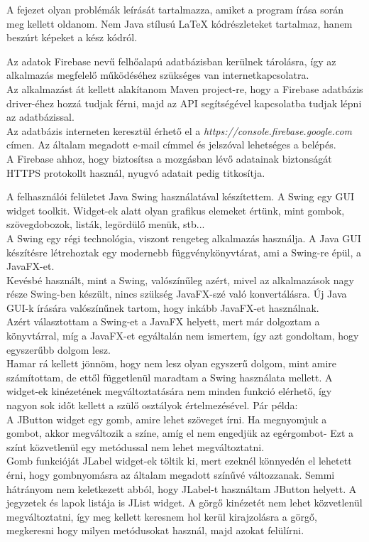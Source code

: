 A fejezet olyan problémák leírását tartalmazza, amiket a program írása során meg kellett oldanom. Nem Java stílusú LaTeX kódrészleteket tartalmaz, hanem beszúrt képeket a kész kódról.

Az adatok Firebase nevű felhőalapú adatbázisban kerülnek tárolásra, így az alkalmazás megfelelő működéséhez szükséges van internetkapcsolatra.
\\Az alkalmazást át kellett alakítanom Maven project-re, hogy a Firebase adatbázis driver-éhez hozzá tudjak férni, majd az API segítségével kapcsolatba tudjak lépni az adatbázissal.
\vspace{5pt}\\Az adatbázis interneten keresztül érhető el a \textit{https://console.firebase.google.com} címen. Az általam megadott e-mail címmel és jelszóval lehetséges a belépés.
\vspace{5pt}\\A Firebase ahhoz, hogy biztosítsa a mozgásban lévő adatainak biztonságát HTTPS protokollt használ, nyugvó adatait pedig titkosítja.

A felhasználói felületet Java Swing használatával készítettem. A Swing egy GUI widget toolkit. Widget-ek alatt olyan grafikus elemeket értünk, mint gombok, szövegdobozok, listák, legördülő menük, stb...
\\A Swing egy régi technológia, viszont rengeteg alkalmazás használja. A Java GUI készítésre létrehoztak egy modernebb függvénykönyvtárat, ami a Swing-re épül, a JavaFX-et.
\\Kevésbé használt, mint a Swing, valószínűleg azért, mivel az alkalmazások nagy része Swing-ben készült, nincs szükség JavaFX-szé való konvertálásra. Új Java GUI-k írására valószínűnek tartom, hogy inkább JavaFX-et használnak.
\vspace{10pt}\\Azért választottam a Swing-et a JavaFX helyett, mert már dolgoztam a könyvtárral, míg a JavaFX-et egyáltalán nem ismertem, így azt gondoltam, hogy egyszerűbb dolgom lesz.
\\Hamar rá kellett jönnöm, hogy nem lesz olyan egyszerű dolgom, mint amire számítottam, de ettől függetlenül maradtam a Swing használata mellett. A widget-ek kinézetének megváltoztatására nem minden funkció elérhető, így nagyon sok időt kellett a szülő osztályok értelmezésével. Pár példa:
\vspace{5pt}\\A JButton widget egy gomb, amire lehet szöveget írni. Ha megnyomjuk a gombot, akkor megváltozik a színe, amíg el nem engedjük az egérgombot- Ezt a színt közvetlenül egy metódussal nem lehet megváltoztatni.
\\Gomb funkcióját JLabel widget-ek töltik ki, mert ezeknél könnyedén el lehetett érni, hogy gombnyomásra az általam megadott színűvé változzanak. Semmi hátrányom nem keletkezett abból, hogy JLabel-t használtam JButton helyett.
A jegyzetek és lapok listája is JList widget. A görgő kinézetét nem lehet közvetlenül megváltoztatni, így meg kellett keresnem hol kerül kirajzolásra a görgő, megkeresni hogy milyen metódusokat használ, majd azokat felülírni. 


